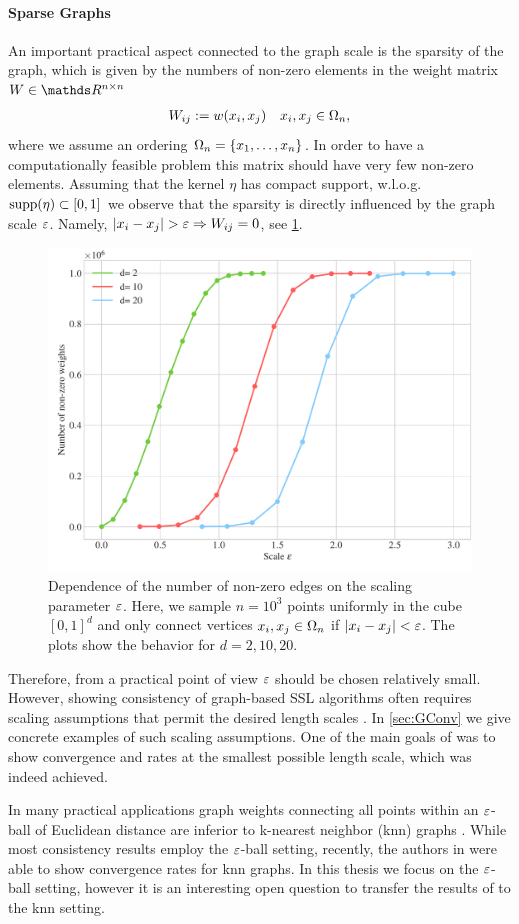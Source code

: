 \paragraph{Sparse Graphs}
An important practical aspect connected to the graph scale is the sparsity of the graph, which is given by the numbers of non-zero elements in the weight matrix $W\in\R^{n\times n}$
%
\begin{align*}
W_{ij}:= w(x_i,x_j) \quad x_i,x_j\in\Omega_n,
\end{align*}
%
where we assume an ordering $\Omega_n=\{x_1,\ldots, x_n\}$. In order to have a computationally feasible problem this matrix should have very few non-zero elements. Assuming that the kernel $\eta$ has compact support, w.l.o.g. $\mathrm{supp}(\eta)\subset [0,1]$ we observe that the sparsity is directly influenced by the graph scale $\gscale$. Namely, $\left|x_i-x_j\right| > \varepsilon \Rightarrow W_{ij}=0$, see \cref{fig:graphscale}.
%
%
\begin{figure}
\centering
\includegraphics[width=.5\textwidth]{code/SSL/NNZ.pdf}
\caption[Dependence of the number of non-zero edges on the scaling parameter $\gscale$.]{Dependence of the number of non-zero edges on the scaling parameter $\gscale$. Here, we sample $n=10^3$ points uniformly in the cube $[0,1]^d$ and only connect vertices $x_i,x_j\in\Omega_n$ if $\left|x_i-x_j\right| < \varepsilon$. The plots show the behavior for $d=2,10,20$.}\label{fig:graphscale}
\end{figure} 
%
%
Therefore, from a practical point of view $\gscale$ should be chosen relatively small. However, showing consistency of graph-based SSL algorithms often requires scaling assumptions that permit the desired length scales \cite{GarcSlep15, slepcev2019analysis, calder2019consistency}. In \cref{sec:GConv} we give concrete examples of such scaling assumptions. One of the main goals of \cite{roith2022continuum, bungert2021uniform} was to show convergence and rates at the smallest possible length scale, which was indeed achieved.
%
%
%
\begin{remark}{}{}
In many practical applications graph weights connecting all points within an $\gscale$-ball of Euclidean distance are inferior to k-nearest neighbor (knn) graphs \cite{calder2020poisson, flores2019algorithms, calder2022improved}. While most consistency results employ the $\gscale$-ball setting, recently, the authors in \cite{calder2022improved} were able to show convergence rates for knn graphs. In this thesis we focus on the $\gscale$-ball setting, however it is an interesting open question to transfer the results of \cite{roith2022continuum, bungert2021uniform, bungert2022ratio} to the knn setting.
\end{remark}
%
%
%
%
